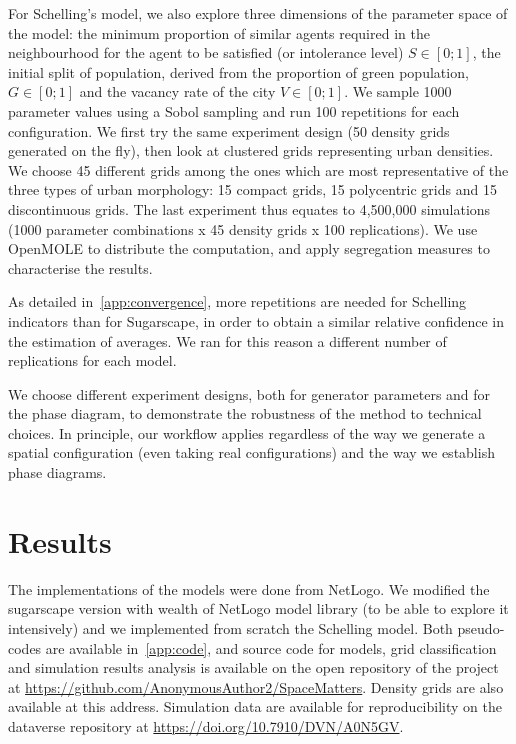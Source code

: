 \documentclass{JASSS}
\begin{document}
For Schelling's model, we also explore three dimensions of the parameter space of the model: the minimum proportion of similar agents required in the neighbourhood for the agent to be satisfied (or intolerance level) $S\in \left[0;1\right]$, the initial split of population, derived from the proportion of green population, $G\in \left[0;1\right]$ and the vacancy rate of the city $V\in \left[0;1\right]$. We sample 1000 parameter values using a Sobol sampling and run 100 repetitions for each configuration. We first try the same experiment design (50 density grids generated on the fly), then look at clustered grids representing urban densities. We choose 45 different grids among the ones which are most representative of the three types of urban morphology: 15 compact grids, 15 polycentric grids and 15 discontinuous grids. The last experiment thus equates to 4,500,000 simulations (1000 parameter combinations x 45 density grids x 100 replications). We use OpenMOLE to distribute the computation, and apply segregation measures to characterise the results.

As detailed in~\ref{app:convergence}, more repetitions are needed for Schelling indicators than for Sugarscape, in order to obtain a similar relative confidence in the estimation of averages. We ran for this reason a different number of replications for each model.



We choose different experiment designs, both for generator parameters and for the phase diagram, to demonstrate the robustness of the method to technical choices. In principle, our workflow applies regardless of the way we generate a spatial configuration (even taking real configurations) and the way we establish phase diagrams.




\section{Results}


The implementations of the models were done from NetLogo. We modified the sugarscape version with wealth of NetLogo model library (to be able to explore it intensively) and we implemented from scratch the Schelling model. Both pseudo-codes are available in~\ref{app:code}, and source code for models, grid classification and simulation results analysis is available on the open repository of the project at \url{https://github.com/AnonymousAuthor2/SpaceMatters}. Density grids are also available at this address. Simulation data are available for reproducibility on the dataverse repository at \url{https://doi.org/10.7910/DVN/A0N5GV}.
\end{document}

